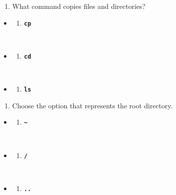 \documentclass[
  letterpaper,
  DIV=11,
  numbers=noendperiod]{scrreprt}
\providecommand{\tightlist}{%
  \setlength{\itemsep}{0pt}\setlength{\parskip}{0pt}}\usepackage{longtable,booktabs,array}
\begin{document}
\begin{enumerate}
\def\labelenumi{\arabic{enumi}.}
\setcounter{enumi}{2}
\tightlist
\item
  What command copies files and directories?
\end{enumerate}

\begin{itemize}
\item
  \begin{enumerate}
  \def\labelenumi{(\Alph{enumi})}
  \tightlist
  \item
    \textbf{\texttt{cp}}\strut \\
  \end{enumerate}
\item
  \begin{enumerate}
  \def\labelenumi{(\Alph{enumi})}
  \setcounter{enumi}{1}
  \tightlist
  \item
    \textbf{\texttt{cd}}\strut \\
  \end{enumerate}
\item
  \begin{enumerate}
  \def\labelenumi{(\Alph{enumi})}
  \setcounter{enumi}{2}
  \tightlist
  \item
    \textbf{\texttt{ls}}
  \end{enumerate}
\end{itemize}

\begin{enumerate}
\def\labelenumi{\arabic{enumi}.}
\setcounter{enumi}{3}
\tightlist
\item
  Choose the option that represents the root directory.
\end{enumerate}

\begin{itemize}
\item
  \begin{enumerate}
  \def\labelenumi{(\Alph{enumi})}
  \tightlist
  \item
    \textbf{\texttt{\textasciitilde{}}}\strut \\
  \end{enumerate}
\item
  \begin{enumerate}
  \def\labelenumi{(\Alph{enumi})}
  \setcounter{enumi}{1}
  \tightlist
  \item
    \textbf{\texttt{/}}\strut \\
  \end{enumerate}
\item
  \begin{enumerate}
  \def\labelenumi{(\Alph{enumi})}
  \setcounter{enumi}{2}
  \tightlist
  \item
    \textbf{\texttt{..}}
  \end{enumerate}
\end{itemize}
\end{document}
